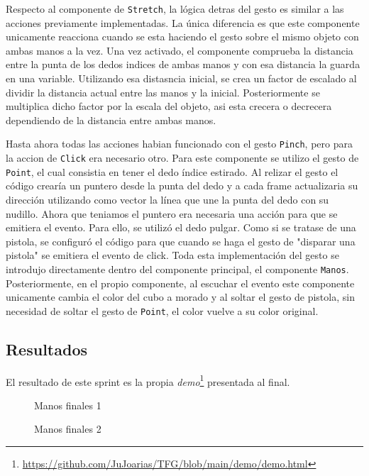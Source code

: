\documentclass[a4paper, 12pt]{book}
\begin{document}
Respecto al componente de \texttt{Stretch}, la lógica detras del gesto es similar a las acciones previamente implementadas. La única diferencia es que este componente unicamente reacciona cuando se esta haciendo el gesto sobre el mismo objeto con ambas manos a la vez.
Una vez activado, el componente comprueba la distancia entre la punta de los dedos indices de ambas manos y con esa distancia la guarda en una variable. Utilizando esa distasncia inicial, se crea un factor de escalado al dividir la distancia actual entre las manos y la inicial. Posteriormente se multiplica dicho factor por la escala del objeto, asi esta crecera o decrecera dependiendo de la distancia entre ambas manos. 

Hasta ahora todas las acciones habian funcionado con el gesto \texttt{Pinch}, pero para la accion de \texttt{Click} era necesario otro. Para este componente se utilizo el gesto de \texttt{Point}, el cual consistia en tener el dedo índice estirado. Al relizar el gesto el código crearía un puntero desde la punta del dedo y a cada frame actualizaria su dirección utilizando como vector la línea que une la punta del dedo con su nudillo. 
Ahora que teniamos el puntero era necesaria una acción para que se emitiera el evento. Para ello, se utilizó el dedo pulgar. Como si se tratase de una pistola, se configuró el código para que cuando se haga el gesto de "disparar una pistola" se emitiera el evento de click. Toda esta implementación del gesto se introdujo directamente dentro del componente principal, el componente \texttt{Manos}. 
Posteriormente, en el propio componente, al escuchar el evento este componente unicamente cambia el color del cubo a morado y al soltar el gesto de pistola, sin necesidad de soltar el gesto de \texttt{Point}, el color vuelve a su color original. 
\subsection{Resultados}
\label{subsec:resultados6}
El resultado de este sprint es la propia \textit{demo}\footnote{\url{https://github.com/JuJoarias/TFG/blob/main/demo/demo.html}} presentada al final. 

\begin{figure}[H] 
  \centering
  \fbox{\rule{0pt}{150pt} \rule{0.7\textwidth}{0pt}} 
  \caption{Manos finales 1}
  \label{fig:sprint6-1}
\end{figure}

\begin{figure}[H] 
  \centering
  \fbox{\rule{0pt}{150pt} \rule{0.7\textwidth}{0pt}} 
  \caption{Manos finales 2}
  \label{fig:sprint6-2}
\end{figure}
\end{document}
